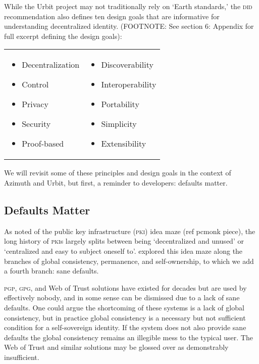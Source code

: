 \documentclass[twoside]{article}
\begin{document}
While the Urbit project may not traditionally rely on `Earth standards,' the \textsc{did} recommendation also defines ten design goals that are informative for understanding decentralized identity. (FOOTNOTE: See section 6: Appendix for full excerpt defining the design goals):

\begin{tabular}{ll}
  \begin{itemize}
    \item  Decentralization
    \item  Control
    \item  Privacy
    \item  Security
    \item  Proof-based
  \end{itemize}
  &
  \begin{itemize}
    \item  Discoverability
    \item  Interoperability
    \item  Portability
    \item  Simplicity
    \item  Extensibility
    \end{itemize}
\end{tabular}

We will revisit some of these principles and design goals in the context of Azimuth and Urbit, but first, a reminder to developers: defaults matter.

\subsection{Defaults Matter}

As  noted of the public key infrastructure (\textsc{pki}) idea maze (ref pcmonk piece), the long history of \textsc{pki}s largely splits between being `decentralized and unused' or `centralized and easy to subject oneself to'.   explored this idea maze along the branches of global consistency, permanence, and self-ownership, to which we add a fourth branch: sane defaults.

\textsc{pgp}, \textsc{gpg}, and Web of Trust solutions have existed for decades but are used by effectively nobody, and in some sense can be dismissed due to a lack of sane defaults. One could argue the shortcoming of these systems is a lack of global consistency, but in practice global consistency is a necessary but not sufficient condition for a self-sovereign identity. If the system does not also provide sane defaults the global consistency remains an illegible mess to the typical user. The Web of Trust and similar solutions may be glossed over as demonstrably insufficient.
\end{document}
